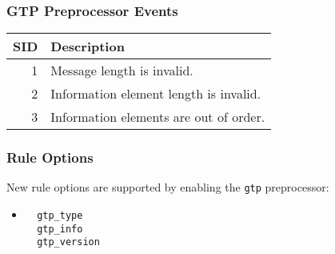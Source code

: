\documentclass[english]{report}
\begin{document}
\subsubsection{GTP Preprocessor Events}
\begin{longtable}{|r|p{13.5cm}|}
\hline
SID & Description\\
\hline
 1 &   Message length is invalid. \\
\hline
 2 &  Information element length is invalid.  \\
\hline
 3 &  Information elements are out of order. \\
\hline
\end{longtable}
\subsubsection{Rule Options}
New rule options are supported by enabling the \texttt{gtp} preprocessor:
\begin{itemize}
\item[]
\begin{verbatim}
  gtp_type
  gtp_info
  gtp_version
\end{verbatim}
\end{itemize}
\end{document}
